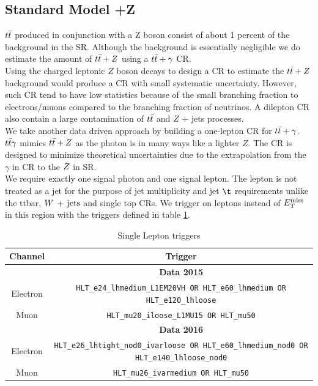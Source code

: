 \subsection{Standard Model \ttbar+Z}
\label{sec:Bkg:ttV}

\indent $t\bar{t}$ produced in conjunction with a Z boson consist of about 1 percent of the background in the SR.  Although the background is essentially negligible we do estimate the amount of $t\bar{t}+Z$ using a $t\bar{t}+\gamma$ CR. \\

\indent Using the charged leptonic $Z$ boson decays to design a CR to estimate the $t\bar{t}+Z$ background would produce a CR with small systematic uncertainty. However, such CR tend to have low statistics because of the small branching fraction to electrons/muons compared to the branching fraction of neutrinos.  A dilepton CR also contain a large contamination of $t\bar{t}$ and $Z$ + jets processes. \\

\indent We take another data driven approach by building a one-lepton CR for $t\bar{t}+\gamma$.  $t\bar{t}\gamma$ mimics $t\bar{t}+Z$ as the photon is in many ways like a lighter $Z$.  The CR is designed to minimize theoretical uncertainties due to the extrapolation from the $\gamma$ in CR to the $Z$ in SR. \\

\indent We require exactly one signal photon and one signal lepton.  The lepton is not treated as a jet for the purpose of jet multiplicity and jet $\t$ requirements unlike the ttbar, $W\,+\,\mathrm{jets}$ and single top CRs.  We trigger on leptons instead of $E_{\mathrm{T}}^{\mathrm{miss}}$ in this region with the triggers defined in table \ref{tb:lepTriggers}.  \\

\begin{table}[htpb]
  \caption{Single Lepton triggers}
  \begin{center}
    \begin{tabular}{c|c} \hline\hline
      Channel & Trigger \\  \hline
              & {\bf Data 2015} \\ \hline
      Electron & \verb+HLT_e24_lhmedium_L1EM20VH OR HLT_e60_lhmedium OR HLT_e120_lhloose+         \\ 
      Muon & \verb+HLT_mu20_iloose_L1MU15 OR HLT_mu50+ \\
      \hline
              & {\bf Data 2016} \\ \hline
      Electron & \verb+HLT_e26_lhtight_nod0_ivarloose OR HLT_e60_lhmedium_nod0 OR HLT_e140_lhloose_nod0+         \\ 
      Muon & \verb+HLT_mu26_ivarmedium OR HLT_mu50+ \\
      \hline \hline
    \end{tabular}
  \end{center}
  \label{tb:lepTriggers}
\end{table}


